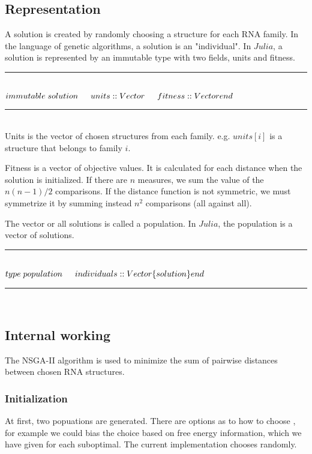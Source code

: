 \documentclass[a4paper, 12pt] {article}
\newcommand{\HRule}{\rule{\linewidth}{0.5mm}}
\begin{document}
\subsection*{Representation}
A solution is created by randomly choosing a structure for each RNA family. In the language of
genetic algorithms, a solution is an "individual".
In $Julia$, a solution is represented by an immutable type with two fields, units and fitness.
\HRule \\[0.4cm]
\begin{math}
\noindent
immutable \; solution\\
\indent units::Vector\\
\indent fitness::Vector\\
end\\
\noindent
\end{math}
\HRule \\[0.4cm]
Units is the vector of chosen structures from each family.
e.g. $units[i]$ is a structure that belongs to family $i$.

Fitness is a vector of objective values. It is calculated for each distance when the solution
is initialized. If there are $n$ measures, we sum the value of the $n(n-1)/2$ comparisons. If the distance
function is not symmetric, we must symmetrize it by summing instead $n^2$ comparisons (all against all).


The vector or all solutions is called a population. In $Julia$, the population is a vector of
solutions.\\
\HRule \\[0.4cm]
\begin{math}
type \; population\\
\indent  individuals::Vector\{solution\}\\
end
\end{math}\\
\HRule \\[0.4cm]



\subsection*{Internal working}
\noindent
The NSGA-II algorithm is used to minimize the sum of pairwise distances between chosen RNA structures.

\subsubsection*{Initialization}
\noindent
At first, two popuations are generated. There are options as to how to choose , for example we could
bias the choice based on free energy information, which we have given for each suboptimal. The current implementation chooses randomly.
\end{document}
